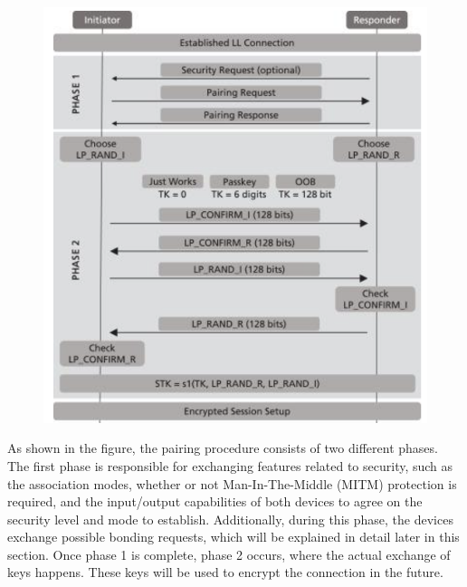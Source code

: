 \documentclass{Configuration_Files/PoliMi3i_thesis}
\begin{document}
\begin{figure}[H]
    \centering
    \includegraphics[scale=0.7]{Bluetooth_Security/2.png}
    \label{fig:pairing_procedure}
\end{figure}

As shown in the figure, the pairing procedure consists of two different phases. The first phase is responsible for exchanging features related to security, such as the association modes, whether or not Man-In-The-Middle (MITM) protection is required, and the input/output capabilities of both devices to agree on the security level and mode to establish. Additionally, during this phase, the devices exchange possible bonding requests, which will be explained in detail later in this section. Once phase 1 is complete, phase 2 occurs, where the actual exchange of keys happens. These keys will be used to encrypt the connection in the future.
\end{document}
